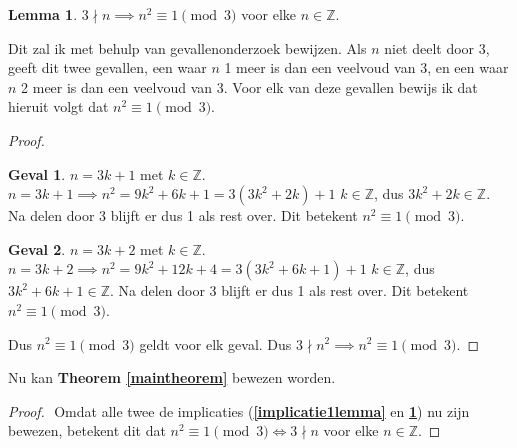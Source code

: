 \documentclass[12pt, dutch, a4paper]{article}
\theoremstyle{definition}
\newtheorem{lemma}{Lemma}[theorem]
\newtheorem{case}{Geval}
\begin{document}
\newpage
\begin{lemma} \label{implicatie2lemma}
    $3 \nmid n \implies n^2 \equiv 1 \pmod{3} $ voor elke $n \in \mathbb{Z}$. 
\end{lemma}

Dit zal ik met behulp van gevallenonderzoek bewijzen. 
Als $n$ niet deelt door 3, geeft dit twee gevallen, een waar $n$ 1 meer is dan 
een veelvoud van 3, en een waar $n$ 2 meer is dan een veelvoud van 3. Voor elk 
van deze gevallen bewijs ik dat hieruit volgt dat $n^2 \equiv 1 \pmod{3}$.

\begin{proof} 
    \begin{case} $n = 3k + 1$ met $k \in \mathbb{Z}$. \newline
        $n = 3k + 1 \implies n^2 = 9k^2 + 6k + 1 = 3(3k^2 + 2k) + 1$ \newline
        $k \in \mathbb{Z}$, dus $3k^2 + 2k \in \mathbb{Z}$. \newline 
        Na delen door 3 blijft er dus 1 als rest over. \newline 
        Dit betekent $n^2 \equiv 1 \pmod{3}$.
    \end{case}
    \begin{case} $n = 3k + 2$ met $k \in \mathbb{Z}$. \newline
        $n = 3k + 2 \implies n^2 = 9k^2 + 12k + 4 = 3(3k^2 + 6k + 1) + 1$ \newline
        $k \in \mathbb{Z}$, dus $3k^2 + 6k + 1 \in \mathbb{Z}$. \newline 
        Na delen door 3 blijft er dus 1 als rest over. \newline 
        Dit betekent $n^2 \equiv 1 \pmod{3}$.
    \end{case}
    Dus $n^2 \equiv 1 \pmod{3}$ geldt voor elk geval. \newline
    Dus $3 \nmid n^2 \implies n^2 \equiv 1 \pmod{3}$.
\end{proof}

Nu kan \textbf{Theorem \ref{maintheorem}} bewezen worden.
\begin{proof} $ $ \newline
    Omdat alle twee de implicaties 
    (\textbf{\cref{implicatie1lemma}} en \textbf{\cref{implicatie2lemma}})
    nu zijn bewezen, betekent dit dat
    $n^2 \equiv 1 \pmod{3} \iff 3 \nmid n$ voor elke $n \in \mathbb{Z}$.
\end{proof}
\end{document}
